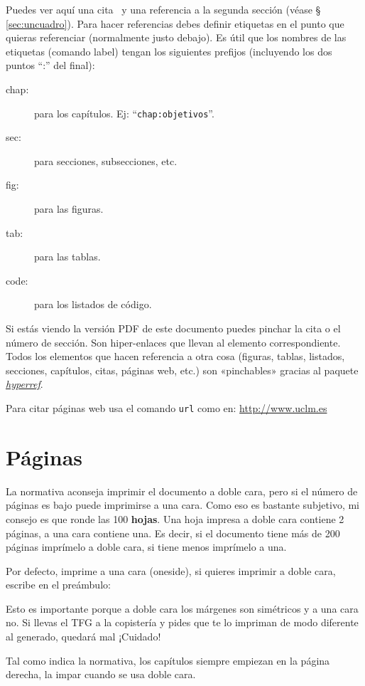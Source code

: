 Puedes ver aquí una cita~\cite{design_patterns} y una referencia a la segunda sección
(véase \S\,\ref{sec:uncuadro}). Para hacer referencias debes definir etiquetas en el punto
que quieras referenciar (normalmente justo debajo). Es útil que los nombres de las
etiquetas (comando label) tengan los siguientes prefijos (incluyendo los dos puntos ``:''
del final):

\begin{description}
\item[chap:] para los capítulos. Ej: ``\texttt{chap:objetivos}''.
\item[sec:] para secciones, subsecciones, etc.
\item[fig:] para las figuras.
\item[tab:] para las tablas.
\item[code:] para los listados de código.
\end{description}

Si estás viendo la versión PDF de este documento puedes pinchar la cita o el número de
sección. Son hiper-enlaces que llevan al elemento correspondiente. Todos los elementos que
hacen referencia a otra cosa (figuras, tablas, listados, secciones, capítulos, citas,
páginas web, etc.) son «pinchables» gracias al paquete
\href{http://latex.tugraz.at/_media/docs/hyperref.pdf}{\emph{hyperref}}.

Para citar páginas web usa el comando \texttt{url} como en: \url{http://www.uclm.es}


\section{Páginas}
\label{sec:paginas}

La normativa aconseja imprimir el documento a doble cara, pero si el número de
páginas es bajo puede imprimirse a una cara. Como eso es bastante subjetivo, mi
consejo es que ronde las 100 \textbf{hojas}. Una hoja impresa a doble cara
contiene 2 páginas, a una cara contiene una. Es decir, si el documento tiene más
de 200 páginas imprímelo a doble cara, si tiene menos imprímelo a una.

Por defecto, \esitfg{} imprime a una cara (oneside), si quieres imprimir a doble cara,
escribe en el preámbulo:


Esto es importante porque a doble cara los márgenes son simétricos y a una cara
no. Si llevas el TFG a la copistería y pides que te lo impriman de modo
diferente al generado, quedará mal ¡Cuidado!

Tal como indica la normativa, los capítulos siempre empiezan en la página
derecha, la impar cuando se usa doble cara.


